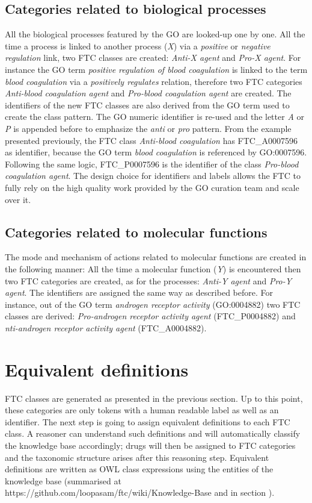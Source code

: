 \documentclass{bioinfo}
\begin{document}
\subsection{Categories related to biological processes}
All the biological processes featured by the GO are looked-up one by one. All the 
time a process is linked to another process (\emph{X}) via a \emph{positive} or \emph{negative regulation} link, two FTC 
classes are created: \emph{Anti-X agent} and \emph{Pro-X agent}. For instance the GO term \emph{positive regulation of blood 
coagulation} is linked to the term \emph{blood coagulation} via a \emph{positively regulates} relation, therefore two FTC 
categories \emph{Anti-blood coagulation agent} and \emph{Pro-blood coagulation agent} are created. The identifiers of the 
new FTC classes are also derived from the GO term used to create the class pattern. The GO numeric identifier 
is re-used and the letter \emph{A} or \emph{P} is appended before to emphasize the \emph{anti} or \emph{pro} pattern. 
From the example presented 
previously, the FTC class \emph{Anti-blood coagulation} has FTC\_A0007596 as identifier, because the GO term \emph{blood coagulation} is 
referenced by GO:0007596. Following the same logic, FTC\_P0007596 is the identifier of the class \emph{Pro-blood coagulation agent}. The 
design choice for identifiers and labels allows the FTC to fully rely on the high quality work provided by the GO curation 
team and scale over it.

\subsection{Categories related to molecular functions}
The mode and mechanism of actions related to molecular functions are created in the following manner: All the time 
a molecular function (\emph{Y}) is encountered then two FTC categories are created, as for the processes: \emph{Anti-Y agent} and 
\emph{Pro-Y agent}. The identifiers are assigned the same way as described before. For instance, out of the GO term \emph{androgen 
receptor activity} (GO:0004882) two FTC classes are derived: \emph{Pro-androgen receptor activity agent} (FTC\_P0004882) and 
\emph{nti-androgen receptor activity agent} (FTC\_A0004882).


\section{Equivalent definitions}
FTC classes are generated as presented in the previous section. Up to this point, these categories 
are only tokens with a human readable label as well as an identifier. The next step is going to 
assign equivalent definitions to each FTC class. A reasoner can understand such definitions and will automatically 
classify the knowledge base accordingly; drugs will then be assigned to FTC categories and the taxonomic structure 
arises after this reasoning step. Equivalent definitions are written as OWL class expressions using the entities of 
the knowledge base (summarised at {{https://github.com/loopasam/ftc/wiki/Knowledge-Base}} and in section ).
\end{document}
